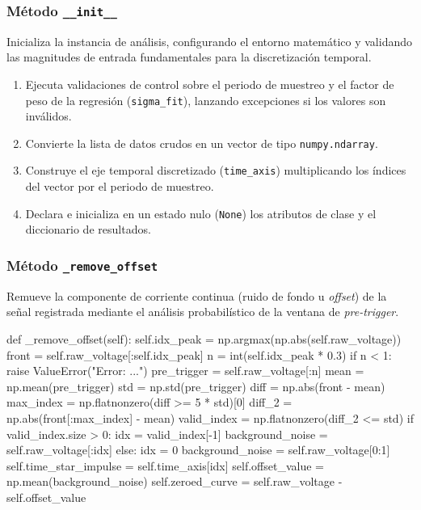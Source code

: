 \subsubsection{Método \texttt{\_\_init\_\_}}
Inicializa la instancia de análisis, configurando el entorno matemático y validando las magnitudes de entrada fundamentales para la discretización temporal.
\begin{enumerate}
    \item Ejecuta validaciones de control sobre el periodo de muestreo y el factor de peso de la regresión (\texttt{sigma\_fit}), lanzando excepciones si los valores son inválidos.
    \item Convierte la lista de datos crudos en un vector de tipo \texttt{numpy.ndarray}.
    \item Construye el eje temporal discretizado (\texttt{time\_axis}) multiplicando los índices del vector por el periodo de muestreo.
    \item Declara e inicializa en un estado nulo (\texttt{None}) los atributos de clase y el diccionario de resultados.
\end{enumerate}

\subsubsection{Método \texttt{\_remove\_offset}}
Remueve la componente de corriente continua (ruido de fondo u \textit{offset}) de la señal registrada mediante el análisis probabilístico de la ventana de \textit{pre-trigger}.

\begin{python}
def _remove_offset(self):
    self.idx_peak = np.argmax(np.abs(self.raw_voltage))
    front = self.raw_voltage[:self.idx_peak]
    n = int(self.idx_peak * 0.3)
    if n < 1:
        raise ValueError("Error: ...")
    pre_trigger = self.raw_voltage[:n]
    mean = np.mean(pre_trigger)
    std = np.std(pre_trigger)
    diff = np.abs(front - mean)
    max_index = np.flatnonzero(diff >= 5 * std)[0]
    diff_2 = np.abs(front[:max_index] - mean)
    valid_index = np.flatnonzero(diff_2 <= std)
    if valid_index.size > 0:
        idx = valid_index[-1]
        background_noise = self.raw_voltage[:idx]
    else:
        idx = 0
        background_noise = self.raw_voltage[0:1]
    self.time_star_impulse = self.time_axis[idx]
    self.offset_value = np.mean(background_noise)
    self.zeroed_curve = self.raw_voltage - self.offset_value
\end{python}

